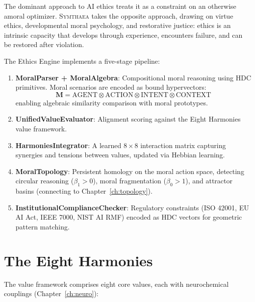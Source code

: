 \documentclass[12pt]{book}
\newcommand{\bind}{\otimes}
\newcommand{\symthaea}{\textsc{Symthaea}}
\begin{document}
The dominant approach to AI ethics treats it as a constraint on an otherwise amoral optimizer. \symthaea{} takes the opposite approach, drawing on virtue ethics, developmental moral psychology, and restorative justice: ethics is an intrinsic capacity that develops through experience, encounters failure, and can be restored after violation.

The Ethics Engine implements a five-stage pipeline:

\begin{enumerate}
  \item \textbf{MoralParser + MoralAlgebra}: Compositional moral reasoning using HDC primitives. Moral scenarios are encoded as bound hypervectors:
  \begin{equation}
  \mathbf{M} = \text{AGENT} \bind \text{ACTION} \bind \text{INTENT} \bind \text{CONTEXT}
  \end{equation}
  enabling algebraic similarity comparison with moral prototypes.
  \item \textbf{UnifiedValueEvaluator}: Alignment scoring against the Eight Harmonies value framework.
  \item \textbf{HarmoniesIntegrator}: A learned $8 \times 8$ interaction matrix capturing synergies and tensions between values, updated via Hebbian learning.
  \item \textbf{MoralTopology}: Persistent homology on the moral action space, detecting circular reasoning ($\beta_1 > 0$), moral fragmentation ($\beta_0 > 1$), and attractor basins (connecting to Chapter~\ref{ch:topology}).
  \item \textbf{InstitutionalComplianceChecker}: Regulatory constraints (ISO 42001, EU AI Act, IEEE 7000, NIST AI RMF) encoded as HDC vectors for geometric pattern matching.
\end{enumerate}

\section{The Eight Harmonies}

The value framework comprises eight core values, each with neurochemical couplings (Chapter~\ref{ch:neuro}):
\end{document}
